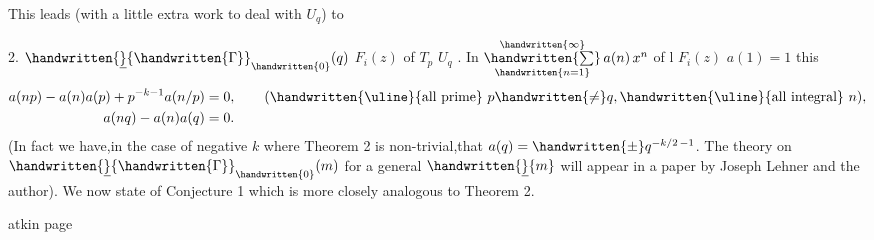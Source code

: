 This leads (with a little extra work to deal with $U_q$) to

 2.  $\handwritten{\underline}{\handwritten{\Gamma}}_{\handwritten{0}}(q)$  $F_i(z)$   of  $T_p$  $U_q$ . In  $\mathop{\handwritten{\sum}}\limits_{\handwritten{n=1}}^{\handwritten{\infty}}a(n)\,x^n$ of l $F_i(z)$  $a(1)=1$ this  
\[
 \begin{aligned}
 a(np)-a(n)a(p)+p^{-k-1}a(n/p)&=0,\qquad (\text{\handwritten{\uline}{all prime} }p\handwritten{\ne}q,\text{\handwritten{\uline}{all integral} } n),\\
 a(nq)-a(n)a(q)&=0. 
 \end{aligned}
\]
\margin{\handwritten{\#}}
(In fact we have,in the case of negative $k$ where Theorem 2 is non-trivial,that $a(q)=\mathbin{\handwritten{\pm}}q^{-k/2\,-1}$. The theory on $\handwritten{\underline}{\handwritten{\Gamma}}_{\handwritten{0}}(m)$ for a general $\handwritten{\underline}{m}$ will appear in a paper by Joseph Lehner and the author). We now state of Conjecture 1 which is more closely analogous to Theorem 2.
\begin{center}atkin page \end{center}

